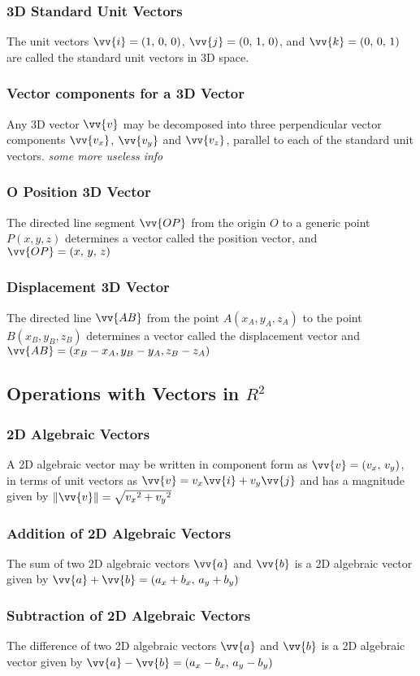 \documentclass{article}
\newcommand{\mv}[1]{
	\lVert\vv{#1}\rVert
}
\begin{document}
	\subsubsection{3D Standard Unit Vectors}
	The unit vectors $\vv{i}=(1,\,0,\,0)$, $\vv{j}=(0,\,1,\,0)$, and $\vv{k}=(0,\,0,\,1)$ are called the standard unit vectors in 3D space. %
	\subsubsection{Vector components for a 3D Vector}
	Any 3D vector $\vv{v}$ may be decomposed into three perpendicular vector components $\vv{v_x}$, $\vv{v_y}$ and $\vv{v_z}$, parallel to each of the standard unit vectors. \textit{some more useless info}
	\subsubsection{O Position 3D Vector}
	The directed line segment $\vv{OP}$ from the origin $O$ to a generic point $P(x,y,z)$ determines a vector called the position vector, and $\vv{OP}=(x,\,y,\,z)$
	\subsubsection{Displacement 3D Vector}
	The directed line $\vv{AB}$ from the point $A(x_A,y_A,z_A)$ to the point $B(x_B,y_B,z_B)$ determines a vector called the displacement vector and $\vv{AB}=(x_B-x_A,y_B-y_A,z_B-z_A)$
	\subsection{Operations with Vectors in $R^2$}
	\subsubsection{2D Algebraic Vectors}
	A 2D algebraic vector may be written in component form as $\vv{v}=(v_x,\,v_y)$, in terms of unit vectors as $\vv{v}=v_x\vv{i}+v_y\vv{j}$ and has a magnitude given by $\mv{v}=\sqrt{{v_x}^2+{v_y}^2}$
	\subsubsection{Addition of 2D Algebraic Vectors}
	The sum of two 2D algebraic vectors $\vv{a}$ and $\vv{b}$ is a 2D algebraic vector given by $\vv{a}+\vv{b}=(a_x+b_x,\,a_y+b_y)$
	\subsubsection{Subtraction of 2D Algebraic Vectors}
	The difference of two 2D algebraic vectors $\vv{a}$ and $\vv{b}$ is a 2D algebraic vector given by $\vv{a}-\vv{b}=(a_x-b_x,\,a_y-b_y)$
\end{document}
